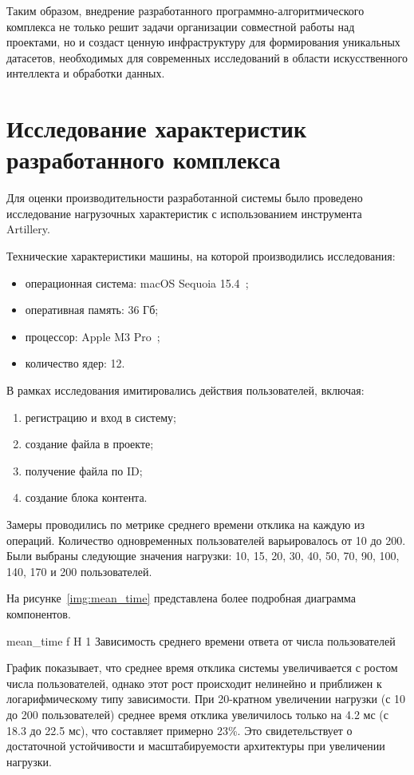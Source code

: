 Таким образом, внедрение разработанного программно-алгоритмического комплекса не только решит задачи организации совместной работы над проектами, но и создаст ценную инфраструктуру для формирования уникальных датасетов, необходимых для современных исследований в области искусственного интеллекта и обработки данных.

\section{Исследование характеристик разработанного комплекса}

Для оценки производительности разработанной системы было проведено исследование нагрузочных характеристик с использованием инструмента Artillery. 

Технические характеристики машины, на которой производились исследования:

\begin{itemize}[wide=12.5mm, leftmargin=12.5mm]
    \item операционная система: macOS Sequoia 15.4~\cite{sequoia};
    \item оперативная память: 36 Гб;
    \item процессор: Apple M3 Pro~\cite{m3};
    \item количество ядер: 12.
\end{itemize}

В рамках исследования имитировались действия пользователей, включая:
\begin{enumerate}[wide=12.5mm, leftmargin=12.5mm]
    \item регистрацию и вход в систему;
    \item создание файла в проекте;
    \item получение файла по ID;
    \item создание блока контента.
\end{enumerate}
Замеры проводились по метрике среднего времени отклика на каждую из операций. 
Количество одновременных пользователей варьировалось от 10 до 200. 
Были выбраны следующие значения нагрузки: 10, 15, 20, 30, 40, 50, 70, 90, 100, 140, 170 и 200 пользователей.

На рисунке~\ref{img:mean_time} представлена более подробная диаграмма компонентов.

	{mean_time}
	{f}
	{H}
	{1\textwidth}
	{Зависимость среднего времени ответа от числа пользователей}

График показывает, что среднее время отклика системы увеличивается с ростом числа пользователей, однако этот рост происходит нелинейно и приближен к логарифмическому типу зависимости. 
При 20-кратном увеличении нагрузки (с 10 до 200 пользователей) среднее время отклика увеличилось только на 4.2 мс (с 18.3 до 22.5 мс), что составляет примерно 23\%.
Это свидетельствует о достаточной устойчивости и масштабируемости архитектуры при увеличении нагрузки.

